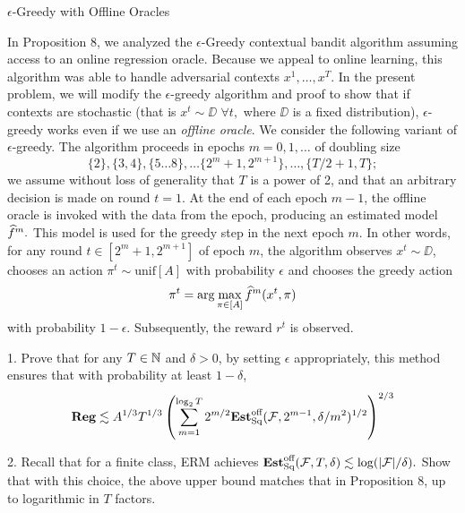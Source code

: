 \begin{exercise}[]{$\epsilon$-Greedy with Offline Oracles}
\end{exercise}
In Proposition 8, we analyzed the $\epsilon$-Greedy contextual bandit algorithm assuming access to an online regression oracle.
Because we appeal to online learning, this algorithm was able to handle adversarial contexts $x^1,\ldots,x^T$. 
In the present problem, we will modify the $\epsilon$-greedy algorithm and proof to show that if contexts are stochastic
(that is $x^t \sim \DD$ $\forall t,$ where $\DD$ is a fixed distribution), $\epsilon$-greedy works even if we use an \textit{offline oracle}.
We consider the following variant of $\epsilon$-greedy. 
The algorithm proceeds in epochs $m = 0,1,\ldots$ of doubling size
\[\{2\}, \{3,4\},\{5\ldots8\},\ldots\{2^m+1,2^{m+1}\},\ldots,\{T/2+1,T\};\]
we assume without loss of generality that $T$ is a power of 2, and that an arbitrary decision is made on round $t = 1$.
At the end of each epoch $m-1$, the offline oracle is invoked with the data from the epoch, producing an estimated model $\widehat{f}^m.$
This model is used for the greedy step in the next epoch $m$. In other words, for any round $t \in [2^m +1,2^{m+1}]$ of epoch $m$,
the algorithm observes $x^t \sim \DD$, chooses an action $\pi^t \sim \text{unif}[A]$ with probability $\epsilon$ and chooses the greedy action 
\[ \pi^t = \arg \max_{\pi \in [A]}\widehat f^m(x^t,\pi)\]
with probability $1-\epsilon$. Subsequently, the reward $r^t$ is observed.

1. Prove that for any $T \in  \mathbb{N}$ and $\delta > 0$, by setting $\epsilon$ appropriately, this method ensures that
with probability at least $1-\delta$,
\[ \textbf{Reg} \lesssim A^{1/3}T^{1/3}\left(\sum_{m=1}^{\log_2 T} 2^{m/2}\textbf{Est}_{\text{Sq}}^{\text{off}}(\mathcal{F},2^{m-1},\delta/m^2)^{1/2}\right)^{2/3}\]

2. Recall that for a finite class, 
ERM achieves $\textbf{Est}_{\text{Sq}}^{\text{off}}(\mathcal{F},T,\delta) \lesssim \log(|\mathcal{F}|/\delta).$ Show that with 
this choice, the above upper bound matches that in Proposition 8, up to logarithmic in $T$ factors.


\begin{solution}[TODO]
\end{solution}
